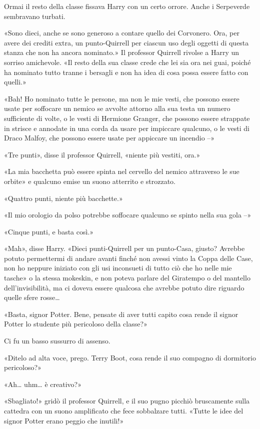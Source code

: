 Ormai il resto della classe fissava Harry con un certo orrore. Anche i Serpeverde sembravano turbati.

«Sono dieci, anche se sono generoso a contare quello dei Corvonero. Ora, per avere dei crediti extra, un punto-Quirrell per ciascun uso degli oggetti di questa stanza che non ha ancora nominato.» Il professor Quirrell rivolse a Harry un sorriso amichevole. «Il resto della sua classe crede che lei sia ora nei guai, poiché ha nominato tutto tranne i bersagli e non ha idea di cosa possa essere fatto con quelli.»

«Bah! Ho nominato tutte le persone, ma non le mie vesti, che possono essere usate per soffocare un nemico se avvolte attorno alla sua testa un numero sufficiente di volte, o le vesti di Hermione Granger, che possono essere strappate in strisce e annodate in una corda da usare per impiccare qualcuno, o le vesti di Draco Malfoy, che possono essere usate per appiccare un incendio –»

«Tre punti», disse il professor Quirrell, «niente più vestiti, ora.»

«La mia bacchetta può essere spinta nel cervello del nemico attraverso le sue orbite» e qualcuno emise un suono atterrito e strozzato.

«Quattro punti, niente più bacchette.»

«Il mio orologio da polso potrebbe soffocare qualcuno se spinto nella sua gola –»

«Cinque punti, e basta così.»

«Mah», disse Harry. «Dieci punti-Quirrell per un punto-Casa, giusto? Avrebbe potuto permettermi di andare avanti finché non avessi vinto la Coppa delle Case, non ho neppure iniziato con gli usi inconsueti di tutto ciò che ho nelle mie tasche» o la stessa mokeskin, e non poteva parlare del Giratempo o del mantello dell’invisibilità, ma ci doveva essere qualcosa che avrebbe potuto dire riguardo quelle sfere rosse…

«Basta, signor Potter. Bene, pensate di aver tutti capito cosa rende il signor Potter lo studente più pericoloso della classe?»

Ci fu un basso sussurro di assenso.

«Ditelo ad alta voce, prego. Terry Boot, cosa rende il suo compagno di dormitorio pericoloso?»

«Ah… uhm… è creativo?»

«Sbagliato!» gridò il professor Quirrell, e il suo pugno picchiò bruscamente sulla cattedra con un suono amplificato che fece sobbalzare tutti. «Tutte le idee del signor Potter erano peggio che inutili!»


